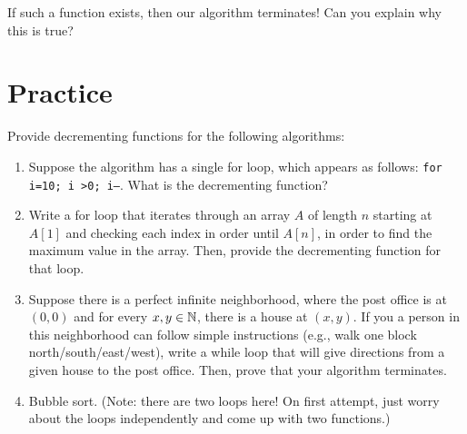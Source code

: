 \documentclass{article}
\begin{document}
If such a function exists, then our algorithm terminates!  Can you explain why
this is true?

\pagebreak
\section*{Practice}

Provide decrementing functions for the following algorithms:

\begin{enumerate}
    \item Suppose the algorithm has a single for loop, which appears as
        follows:
        \texttt{for i=10; i >0; i--}.
        What is the decrementing function?
        \practice
    \item Write a for loop that iterates through an array $A$ of length $n$
        starting at $A[1]$ and checking each index in order until $A[n]$, in
        order to find the maximum value in the array.  Then, provide the
        decrementing function for that loop.
        \practice
    \item Suppose there is a perfect infinite neighborhood, where the post
        office is at $(0,0)$ and for every $x, y \in {\mathbb N}$, there is a house at
        $(x,y)$. If you a person in this neighborhood can follow simple
        instructions (e.g., walk one block north/south/east/west), write a while
        loop that will give directions from a given house to the post office.
        Then, prove that your algorithm terminates.
        \practice
    \item Bubble sort. (Note: there are two loops here! On first attempt, just
        worry about the loops independently and come up with two functions.)

\end{enumerate}
\end{document}
